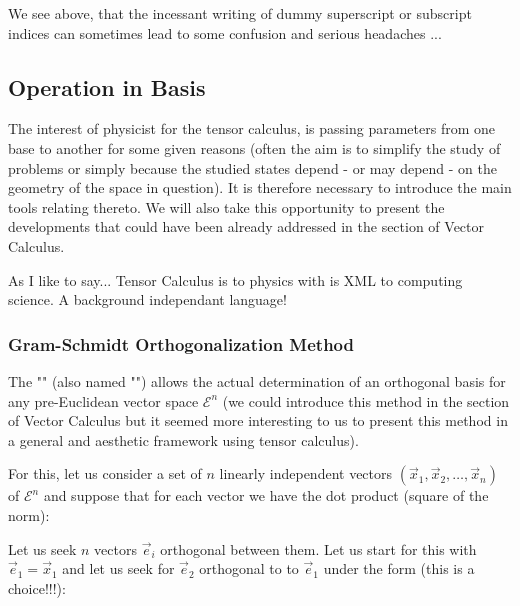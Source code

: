 	\begin{tcolorbox}[title=Remark,colframe=black,arc=10pt]
	We see above, that the incessant writing  of dummy superscript or subscript indices  can sometimes lead to some confusion and serious headaches ...
	\end{tcolorbox}
	
	\pagebreak
	\subsection{Operation in Basis}
	The interest of physicist for the tensor calculus, is passing parameters from one base to another for some given reasons (often the aim is to simplify the study of problems or simply because the studied states depend - or may depend - on the geometry of the space in question). It is therefore necessary to introduce the main tools relating thereto. We will also take this opportunity to present the developments that could have been already addressed in the section of Vector Calculus.
	\begin{tcolorbox}[title=Remark,colframe=black,arc=10pt]
	As I like to say... Tensor Calculus is to physics with is XML to computing science. A background independant language!
	\end{tcolorbox}
	
	\subsubsection{Gram-Schmidt Orthogonalization Method}
	The "" (also named "") allows the actual determination of an orthogonal basis for any pre-Euclidean vector space $\mathcal{E}^n$ (we could introduce this method in the section of Vector Calculus but it seemed more interesting to us to present this method in a general and aesthetic framework using tensor calculus).
	
	For this, let us consider a set of $n$ linearly independent vectors $(\vec{x}_1,\vec{x}_2,\ldots,\vec{x}_n)$ of $\mathcal{E}^n$ and suppose that for each vector we have the dot product (square of the norm):
	
	Let us seek $n$ vectors $\vec{e}_i$ orthogonal between them. Let us start for this with $\vec{e}_1=\vec{x}_1$ and let us seek for $\vec{e}_2$ orthogonal to to $\vec{e}_1$ under the form (this is a choice!!!):
	
